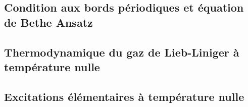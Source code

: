 \subsection{Condition aux bords périodiques et équation de Bethe Ansatz}

\subsection{Thermodynamique du gaz de Lieb-Liniger à température nulle}

\subsection{Excitations élémentaires à température nulle}
%